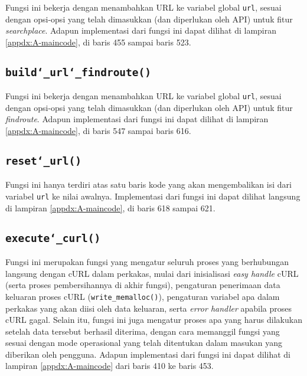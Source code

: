 Fungsi ini bekerja dengan menambahkan URL ke variabel global \verb|url|, sesuai dengan opsi-opsi yang telah dimasukkan (dan diperlukan oleh API) untuk fitur \textit{searchplace}. Adapun implementasi dari fungsi ini dapat dilihat di lampiran \ref{appdx:A-maincode}, di baris 455 sampai baris 523.

\subsection{\texttt{build\char`_url\char`_findroute()}}
\label{sec:testing-implementation-buildurl-findroute}

Fungsi ini bekerja dengan menambahkan URL ke variabel global \verb|url|, sesuai dengan opsi-opsi yang telah dimasukkan (dan diperlukan oleh API) untuk fitur \textit{findroute}. Adapun implementasi dari fungsi ini dapat dilihat di lampiran \ref{appdx:A-maincode}, di baris 547 sampai baris 616.

\subsection{\texttt{reset\char`_url()}}
\label{sec:testing-implementation-buildurl-reset}

Fungsi ini hanya terdiri atas satu baris kode yang akan mengembalikan isi dari variabel \verb|url| ke nilai awalnya. Implementasi dari fungsi ini dapat dilihat langsung di lampiran \ref{appdx:A-maincode}, di baris 618 sampai 621.
	
\subsection{\texttt{execute\char`_curl()}}
\label{sec:testing-implementation-curl-execute}

Fungsi ini merupakan fungsi yang mengatur seluruh proses yang berhubungan langsung dengan cURL dalam perkakas, mulai dari inisialisasi \textit{easy handle} cURL (serta proses pembersihannya di akhir fungsi), pengaturan penerimaan data keluaran proses cURL (\verb|write_memalloc()|), pengaturan variabel apa dalam perkakas yang akan diisi oleh data keluaran, serta \textit{error handler} apabila proses cURL gagal. Selain itu, fungsi ini juga mengatur proses apa yang harus dilakukan setelah data tersebut berhasil diterima, dengan cara memanggil fungsi yang sesuai dengan mode operasional yang telah ditentukan dalam masukan yang diberikan oleh pengguna. Adapun implementasi dari fungsi ini dapat dilihat di lampiran \ref{appdx:A-maincode} dari baris 410 ke baris 453.

